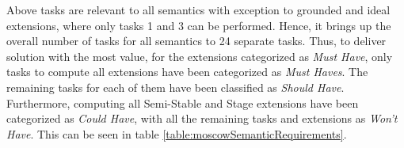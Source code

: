 Above tasks are relevant to all semantics with exception to grounded and ideal extensions, where only tasks 1 and 3 can be performed. Hence, it brings up the overall number of tasks for all semantics to 24 separate tasks. Thus, to deliver solution with the most value, for the extensions categorized as \textit{Must Have}, only tasks to compute all extensions have been categorized as \textit{Must Haves}. The remaining tasks for each of them have been classified as \textit{Should Have}. Furthermore, computing all Semi-Stable and Stage extensions have been categorized as \textit{Could Have}, with all the remaining tasks and extensions as \textit{Won't Have}. This can be seen in table \ref{table:moscowSemanticRequirements}.


